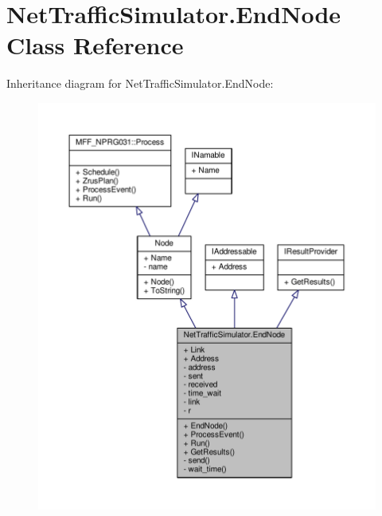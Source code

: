 \hypertarget{classNetTrafficSimulator_1_1EndNode}{\section{Net\-Traffic\-Simulator.\-End\-Node Class Reference}
\label{classNetTrafficSimulator_1_1EndNode}
}


Inheritance diagram for Net\-Traffic\-Simulator.\-End\-Node\-:
\nopagebreak
\begin{figure}[H]
\begin{center}
\leavevmode
\includegraphics[width=350pt]{classNetTrafficSimulator_1_1EndNode__inherit__graph}
\end{center}
\end{figure}


